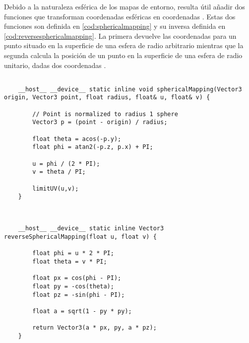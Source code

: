 Debido a la naturaleza esférica de los mapas de entorno, resulta útil añadir dos funciones que transforman coordenadas esféricas en coordenadas . Estas dos funciones son  definida en \autoref{cod:sphericalmapping} y su inversa  definida en \autoref{cod:reversesphericalmapping}. La primera devuelve las coordenadas  para un punto situado en la superficie de una esfera de radio arbitrario mientras que la segunda calcula la posición de un punto en la superficie de una esfera de radio unitario, dadas dos coordenadas .

\label{sphericalmapping}

\begin{minipage}[c]{0.95\textwidth}
\begin{lstlisting}[label={cod:sphericalmapping}, caption={Código para calcular las coordenadas u,v a través de un vector en una esfera de radio determinado}]
	
    __host__ __device__ static inline void sphericalMapping(Vector3 origin, Vector3 point, float radius, float& u, float& v) {

        // Point is normalized to radius 1 sphere
        Vector3 p = (point - origin) / radius;

        float theta = acos(-p.y);
        float phi = atan2(-p.z, p.x) + PI;

        u = phi / (2 * PI);
        v = theta / PI;

        limitUV(u,v);
    }
	
\end{lstlisting}
\end{minipage}

\begin{minipage}[c]{0.95\textwidth}
\begin{lstlisting}[label={cod:reversesphericalmapping}, caption={Función inversa al mapeo esférico}]
		
	__host__ __device__ static inline Vector3 reverseSphericalMapping(float u, float v) {

        float phi = u * 2 * PI;
        float theta = v * PI;

        float px = cos(phi - PI);
        float py = -cos(theta);
        float pz = -sin(phi - PI);

        float a = sqrt(1 - py * py);

        return Vector3(a * px, py, a * pz);
    }
	
\end{lstlisting}
\end{minipage}


